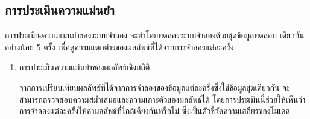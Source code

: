 \subsection{การประเมินความแม่นยำ}
\begin{mypara}
    \indent การประเมิณความแม่นยำของระบบจำลอง จะทำโดยทดลองระบบจำลองด้วยชุดข้อมูลทดสอบ
    เดียวกันอย่างน้อย 5 ครั้ง เพื่อดูความแตกต่างของผลลัพธ์ที่ได้จากการจำลองแต่ละครั้ง
\end{mypara}
\begin{enumerate}
    \item การประเมินความแม่นยำของผลลัพธ์เชิงสถิติ
            \begin{mypara}
                \indent จากการเปรียบเทียบผลลัพธ์ที่ได้จากการจำลองของข้อมูลแต่ละครั้งซึ่งใช้ข้อมูลชุดเดียวกัน 
                จะสามารถตรวจสอบความสม่ำเสมอและความเกาะตัวของผลลัพธ์ได้ โดยการประเมินนี้ช่วยให้เห็นว่า 
                การจำลองแต่ละครั้งให้ค่าผลลัพธ์ที่ใกล้เคียงกันหรือไม่ ซึ่งเป็นตัวชี้วัดความเสถียรของโมเดล 
            \end{mypara}
\end{enumerate}
